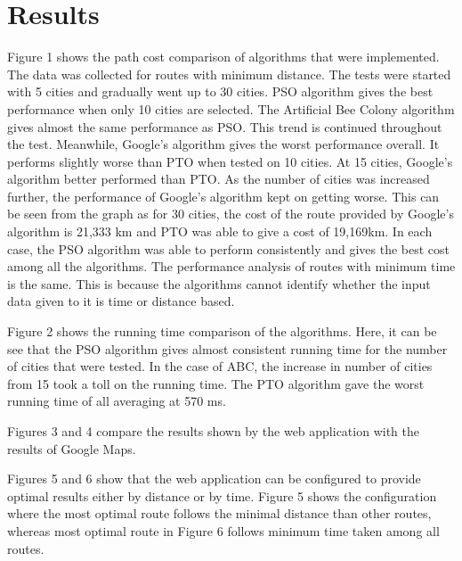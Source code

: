 \documentclass[conference]{IEEEtran}
\begin{document}
\section {Results}

Figure 1 shows the path cost comparison of algorithms that were implemented. The data was collected for routes with minimum distance. The tests were started with 5 cities and gradually went up to 30 cities. PSO algorithm gives the best performance when only 10 cities are selected. The Artificial Bee Colony algorithm gives almost the same performance as PSO.  This trend is continued throughout the test. Meanwhile, Google’s algorithm gives the worst performance overall. It performs slightly worse than PTO when tested on 10 cities. At 15 cities, Google’s algorithm better performed than PTO. As the number of cities was increased further, the performance of Google’s algorithm kept on getting worse. This can be seen from the graph as for 30 cities, the cost of the route provided by Google’s algorithm is 21,333 km and PTO was able to give a cost of 19,169km. In each case, the PSO algorithm was able to perform consistently and gives the best cost among all the algorithms. The performance analysis of routes with minimum time is the same. This is because the algorithms cannot identify whether the input data given to it is time or distance based.

Figure 2 shows the running time comparison of the algorithms. Here, it can be see that the PSO algorithm gives almost consistent running time for the number of cities that were tested. In the case of ABC, the increase in number of cities from 15 took a toll on the running time. The PTO algorithm gave the worst running time of all averaging at 570 ms. 

Figures 3 and 4 compare the results shown by the web application with the results of Google Maps. 

Figures 5 and 6 show that the web application can be configured to provide optimal results either by distance or by time. Figure 5 shows the configuration where the most optimal route follows the minimal distance than other routes, whereas most optimal route in Figure 6 follows minimum time taken among all routes.
\end{document}
